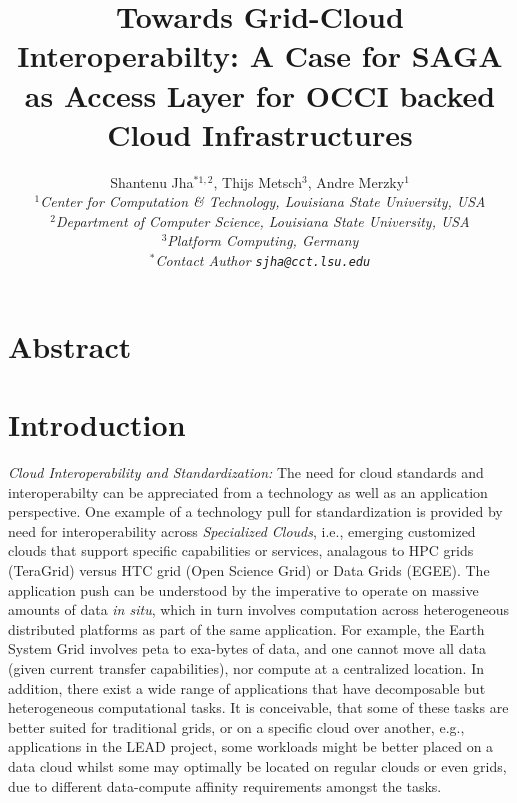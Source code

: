 \documentclass[10pt,conference,final,letterpaper,twoside,twocolumn,]{IEEEtran}
\begin{document}
\title{Towards Grid-Cloud Interoperabilty: A Case for SAGA as Access
  Layer for OCCI backed Cloud Infrastructures}

\author{Shantenu Jha$^{*1,2}$, Thijs Metsch$^{3}$, Andre Merzky$^{1}$\\
  \small{\emph{$^{1}$Center for Computation \& Technology, Louisiana State University, USA}}\\
  \small{\emph{$^{2}$Department of Computer Science, Louisiana State University, USA}}\\
  \small{\emph{$^{3}$Platform   Computing, Germany}}\\
  \small{\emph{$^{*}$Contact Author \texttt{sjha@cct.lsu.edu}}}
  }


\maketitle

\section*{Abstract}



\section{Introduction}

{\it Cloud Interoperability and Standardization:} The need for cloud
standards and interoperabilty can be appreciated from a technology as
well as an application perspective. One example of a technology pull
for standardization is provided by need for interoperability across
{\it Specialized Clouds}, i.e., emerging customized clouds that
support specific capabilities or services, analagous to HPC grids
(TeraGrid) versus HTC grid (Open Science Grid) or Data Grids (EGEE).
The application push can be understood by the imperative to operate on
massive amounts of data {\it in situ}, which in turn involves
computation across heterogeneous distributed platforms as part of the
same application.  For example, the Earth System Grid involves peta to
exa-bytes of data, and one cannot move all data (given current
transfer capabilities), nor compute at a centralized location.  In
addition, there exist a wide range of applications that have
decomposable but heterogeneous computational tasks. It is conceivable,
that some of these tasks are better suited for traditional grids, or
on a specific cloud over another, e.g., applications in the LEAD
project, some workloads might be better placed on a data cloud whilst
some may optimally be located on regular clouds or even grids, due to
different data-compute affinity requirements amongst the tasks.
\end{document}
